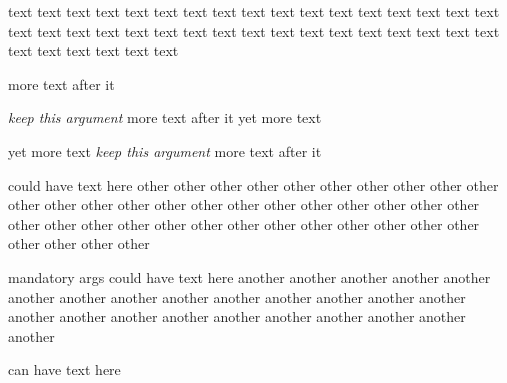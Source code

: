 \documentclass{article}
\begin{document}
\begin{myenvironment}
  text text text text text text text text text text 
  text text text text text text text text text text 
  text text text text text text text text text text 
  text text text text text text text text text text 
\end{myenvironment}

 more text after it 

\textit{keep this argument} more text after it  yet more text

 yet more text \textit{keep this argument} more text after it 

\begin{anotherenvironment} could have text here
  other other other other other other other other other other 
  other other other other other other other other other other 
  other other other other other other other other other other 
  other other other other other other other other other other 
\end{anotherenvironment}

\begin{anotherenvironment}{mandatory args} could have text here
  another another another another another another 
  another another another another another another 
  another another another another another another 
  another another another another another another 
\end{anotherenvironment} can have text here
\end{document}
